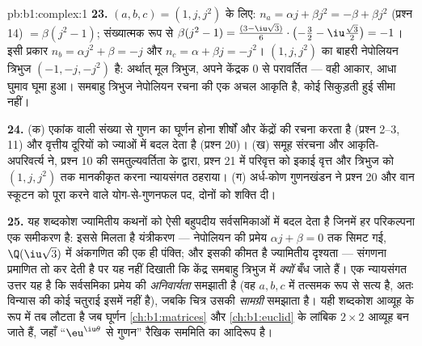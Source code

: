 \begin{solution}{pb:b1:complex:1}
\textbf{23.} $(a, b, c) = (1, j, j^2)$ के लिए: $n_a = \alpha j + \beta j^2 =
-\beta + \beta j^2$ (प्रश्न 14) $= \beta(j^2 - 1)$; संख्यात्मक रूप से
$\beta(j^2 - 1) = \frac{(3 - \iu\sqrt3)}6 \cdot \bigl(-\frac32 -
\iu\frac{\sqrt3}2\bigr) = -1$। इसी प्रकार $n_b = \alpha j^2 + \beta = -j$ और
$n_c = \alpha + \beta j = -j^2$। $(1, j, j^2)$ का बाहरी नेपोलियन त्रिभुज
$(-1, -j, -j^2)$ है: अर्थात् मूल त्रिभुज, अपने केंद्रक $0$ से परावर्तित ---
वही आकार, आधा घुमाव घूमा हुआ। समबाहु त्रिभुज नेपोलियन रचना की एक अचल आकृति
है, कोई सिकुड़ती हुई सीमा नहीं।

\textbf{24.} (क) एकांक  वाली संख्या से गुणन का घूर्णन होना शीर्षों और
केंद्रों की रचना करता है (प्रश्न 2--3, 11) और वृत्तीय दूरियों को ज्याओं में
बदल देता है (प्रश्न 20)। (ख) समूह संरचना और आकृति-अपरिवर्त्य ने, प्रश्न 10
की समतुल्यवर्तिता के द्वारा, प्रश्न 21 में परिवृत्त को इकाई वृत्त और त्रिभुज
को $(1, j, j^2)$ तक मानकीकृत करना न्यायसंगत ठहराया। (ग) अर्ध-कोण गुणनखंडन ने
प्रश्न 20 और वान स्कूटन को पूरा करने वाले योग-से-गुणनफल पद, दोनों को शक्ति
दी।

\textbf{25.} यह शब्दकोश ज्यामितीय कथनों को ऐसी बहुपदीय सर्वसमिकाओं में बदल
देता है जिनमें हर परिकल्पना एक समीकरण है: इससे मिलता है यंत्रीकरण ---
नेपोलियन की प्रमेय $\alpha j + \beta = 0$ तक सिमट गई, $\Q(\iu\sqrt3)$ में
अंकगणित की एक ही पंक्ति; और इसकी कीमत है ज्यामितीय दृश्यता --- संगणना
प्रमाणित तो कर देती है पर यह नहीं दिखाती कि केंद्र समबाहु त्रिभुज में
\emph{क्यों} बँध जाते हैं। एक न्यायसंगत उत्तर यह है कि सर्वसमिका प्रमेय की
\emph{अनिवार्यता} समझाती है (वह $a, b, c$ में तत्समक रूप से सत्य है, अतः
विन्यास की कोई चतुराई इसमें नहीं है), जबकि चित्र उसकी \emph{सामग्री} समझाता
है। यही शब्दकोश आव्यूह के रूप में तब लौटता है जब घूर्णन
\cref{ch:b1:matrices} और \cref{ch:b1:euclid} के लांबिक $2 \times 2$ आव्यूह
बन जाते हैं, जहाँ ``$\eu^{\iu\theta}$ से गुणन'' रैखिक सममिति का आदिरूप है।
\end{solution}
